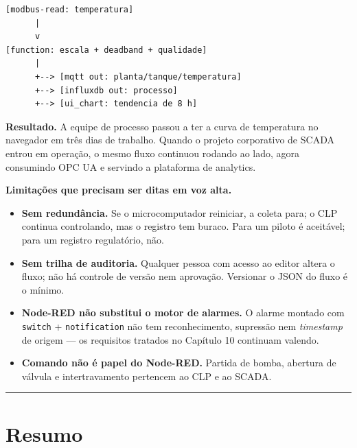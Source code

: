 \begin{lstlisting}
[modbus-read: temperatura]
      |
      v
[function: escala + deadband + qualidade]
      |
      +--> [mqtt out: planta/tanque/temperatura]
      +--> [influxdb out: processo]
      +--> [ui_chart: tendencia de 8 h]
\end{lstlisting}

\textbf{Resultado.} A equipe de processo passou a ter a curva de temperatura no navegador em três dias
de trabalho. Quando o projeto corporativo de SCADA entrou em operação, o mesmo fluxo continuou
rodando ao lado, agora consumindo OPC UA e servindo a plataforma de analytics.

\textbf{Limitações que precisam ser ditas em voz alta.}

\begin{itemize}
\tightlist
\item
  \textbf{Sem redundância.} Se o microcomputador reiniciar, a coleta para; o CLP continua controlando,
  mas o registro tem buraco. Para um piloto é aceitável; para um registro regulatório, não.
\item
  \textbf{Sem trilha de auditoria.} Qualquer pessoa com acesso ao editor altera o fluxo; não há
  controle de versão nem aprovação. Versionar o JSON do fluxo é o mínimo.
\item
  \textbf{Node-RED não substitui o motor de alarmes.} O alarme montado com \passthrough{\lstinline!switch!} + \passthrough{\lstinline!notification!}
  não tem reconhecimento, supressão nem \emph{timestamp} de origem --- os requisitos tratados no
  Capítulo 10 continuam valendo.
\item
  \textbf{Comando não é papel do Node-RED.} Partida de bomba, abertura de válvula e intertravamento
  pertencem ao CLP e ao SCADA.
\end{itemize}

\begin{center}\rule{0.5\linewidth}{0.5pt}\end{center}

\section{Resumo}\label{resumo}

